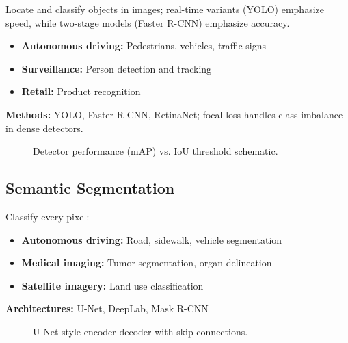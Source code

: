 Locate and classify objects in images; real-time variants (YOLO) emphasize speed, while two-stage models (Faster R-CNN) emphasize accuracy.
\begin{itemize}
    \item \textbf{Autonomous driving:} Pedestrians, vehicles, traffic signs
    \item \textbf{Surveillance:} Person detection and tracking
    \item \textbf{Retail:} Product recognition
\end{itemize}

\textbf{Methods:} YOLO, Faster R-CNN, RetinaNet; focal loss handles class imbalance in dense detectors.

\begin{figure}[h]
  \centering
  \caption{Detector performance (mAP) vs. IoU threshold schematic.}
  \label{fig:map-iou}
\end{figure}

\subsection{Semantic Segmentation}

Classify every pixel:
\begin{itemize}
    \item \textbf{Autonomous driving:} Road, sidewalk, vehicle segmentation
    \item \textbf{Medical imaging:} Tumor segmentation, organ delineation
    \item \textbf{Satellite imagery:} Land use classification
\end{itemize}

\textbf{Architectures:} U-Net, DeepLab, Mask R-CNN

\begin{figure}[h]
  \centering
  \caption{U-Net style encoder-decoder with skip connections.}
  \label{fig:unet-schematic}
\end{figure}

